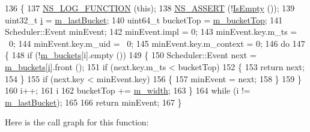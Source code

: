 \begin{DoxyCode}
136 \{
137   \hyperlink{log-macros-disabled_8h_a90b90d5bad1f39cb1b64923ea94c0761}{NS\_LOG\_FUNCTION} (\textcolor{keyword}{this});
138   \hyperlink{assert_8h_a6dccdb0de9b252f60088ce281c49d052}{NS\_ASSERT} (!\hyperlink{classns3_1_1CalendarScheduler_a3b77785ce158cd5c3979acf5ed0ae7a0}{IsEmpty} ());
139   uint32\_t \hyperlink{bernuolliDistribution_8m_a6f6ccfcf58b31cb6412107d9d5281426}{i} = \hyperlink{classns3_1_1CalendarScheduler_aac53aae4bda7758ba73e45bfe775fec0}{m\_lastBucket};
140   uint64\_t bucketTop = \hyperlink{classns3_1_1CalendarScheduler_a8a8746e4fc94345c5584629b78b25549}{m\_bucketTop};
141   Scheduler::Event minEvent;
142   minEvent.impl = 0;
143   minEvent.key.m\_ts = ~0;
144   minEvent.key.m\_uid = ~0;
145   minEvent.key.m\_context = 0;
146   \textcolor{keywordflow}{do}
147     \{
148       \textcolor{keywordflow}{if} (!\hyperlink{classns3_1_1CalendarScheduler_ad022479890e917ef6a64ef814284033e}{m\_buckets}[i].empty ())
149         \{
150           Scheduler::Event next = \hyperlink{classns3_1_1CalendarScheduler_ad022479890e917ef6a64ef814284033e}{m\_buckets}[\hyperlink{bernuolliDistribution_8m_a6f6ccfcf58b31cb6412107d9d5281426}{i}].front ();
151           \textcolor{keywordflow}{if} (next.key.m\_ts < bucketTop)
152             \{
153               \textcolor{keywordflow}{return} next;
154             \}
155           \textcolor{keywordflow}{if} (next.key < minEvent.key)
156             \{
157               minEvent = next;
158             \}
159         \}
160       i++;
161       i %
162       bucketTop += \hyperlink{classns3_1_1CalendarScheduler_acbe04fc4f382aa5759beb2dc1cdc0523}{m\_width};
163     \}
164   \textcolor{keywordflow}{while} (i != \hyperlink{classns3_1_1CalendarScheduler_aac53aae4bda7758ba73e45bfe775fec0}{m\_lastBucket});
165 
166   \textcolor{keywordflow}{return} minEvent;
167 \}
\end{DoxyCode}


Here is the call graph for this function\+:


